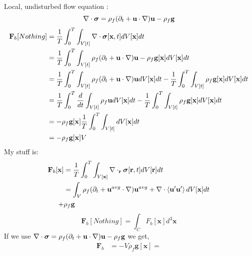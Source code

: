 \documentclass[12pt]{My_preprint}
\begin{document}
Local, undisturbed flow equation :
\begin{equation}
    \mathbf{\nabla}\cdot\bm\sigma = \rho_f (\partial_t + \textbf{u}\cdot \mathbf{\nabla})\textbf{u} - \rho_f \textbf{g}
\end{equation}
\begin{align}
    \textbf{F}_b[Nothing] &= 
    \frac{1}{T}\int_{0}^{T}
     \int_{V[t]}\mathbf{\nabla}\cdot \bm\sigma[\textbf{x},t] dV[\textbf{x}] dt\\
     &=
     \frac{1}{T}\int_{0}^{T}
      \int_{V[t]}\rho_f (\partial_t + \textbf{u}\cdot \mathbf{\nabla})\textbf{u} - \rho_f \textbf{g}[\textbf{x}] dV[\textbf{x}] dt\\
     &=
     \frac{1}{T}\int_{0}^{T}
     \int_{V[t]}\rho_f (\partial_t + \textbf{u}\cdot \mathbf{\nabla})\textbf{u} dV[\textbf{x}] dt
     -\frac{1}{T}\int_{0}^{T}
      \int_{V[t]}\rho_f \textbf{g}[\textbf{x}] dV[\textbf{x}] dt\\
     &=
     \frac{1}{T}\int_{0}^{T}
     \frac{d}{dt}\int_{V[t]}\rho_f \textbf{u} dV[\textbf{x}] dt
     -\frac{1}{T}\int_{0}^{T}
      \int_{V[t]}\rho_f \textbf{g}[\textbf{x}] dV[\textbf{x}] dt\\
     &=
     -
      \rho_f \textbf{g}[\textbf{x}] 
      \frac{1}{T}\int_{0}^{T}
      \int_{V[t]} dV[\textbf{x}] dt\\
     &=
     -
      \rho_f \textbf{g}[\textbf{x}] 
      V
      \\
\end{align}
My stuff is: 
\begin{align}
    \textbf{F}_b[\textbf{x}] &= 
    \frac{1}{T}\int_{0}^{T}
     \int_{V[\textbf{x}]}\mathbf{\nabla}\cdot_\textbf{r} \bm\sigma[\textbf{r},t]  dV[\textbf{r}] dt\\
     &=
     \int_{V}\rho_f (\partial_t + \textbf{u}^{avg}\cdot \mathbf{\nabla})\textbf{u}^{avg}+ \mathbf{\nabla}\cdot \left<\textbf{u}'\textbf{u}'\right> dV[\textbf{x}] dt\\
     + &\rho_f \textbf{g}\\
\end{align}
\begin{equation}
    \textbf{F}_b[Nothing]  = \int_C F_b[\textbf{x}] d^3 \textbf{x}
\end{equation}
If we use $\mathbf{\nabla}\cdot\bm\sigma = \rho_f (\partial_t + \textbf{u}\cdot \mathbf{\nabla})\textbf{u} - \rho_f \textbf{g}$ we get, 
\begin{align}
    \textbf{F}_b &= 
     -
       V \rho_f \textbf{g}[\textbf{x}]  
      =
\end{align}
\end{document}
